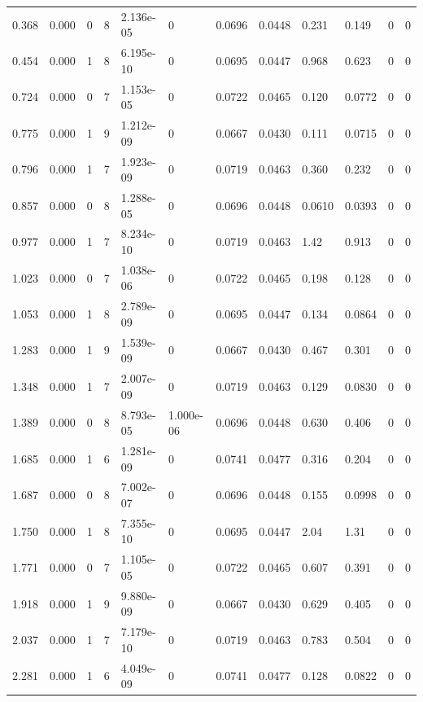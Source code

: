 \documentclass[preview]{standalone}
\begin{document}
{{\begin{tabular}{L{1.2cm}C{1.2cm} C{0.3cm}C{0.5cm} C{1.4cm}C{1.4cm} C{1.4cm}C{1.4cm} C{1.6cm}C{1.6cm} C{1.6cm}C{1.6cm}}
  0.368  &  0.000  & 0     &  8 &  2.136e-05  & 0  &  0.0696&   0.0448& 0.231 & 0.149   &  0 & 0  \\ 
  0.454  &  0.000  & 1     &  8 &  6.195e-10  & 0  &  0.0695&   0.0447& 0.968 & 0.623   &  0 & 0  \\ 
  0.724  &  0.000  & 0     &  7 &  1.153e-05  & 0  &  0.0722&   0.0465& 0.120 & 0.0772   &  0 & 0  \\ 
  0.775  &  0.000  & 1     &  9 &  1.212e-09  & 0  &  0.0667&   0.0430& 0.111 & 0.0715   &  0 & 0  \\ 
  0.796  &  0.000  & 1     &  7 &  1.923e-09  & 0  &  0.0719&   0.0463& 0.360 & 0.232   &  0 & 0  \\ 
  0.857  &  0.000  & 0     &  8 &  1.288e-05  & 0  &  0.0696&   0.0448& 0.0610 & 0.0393   &  0 & 0  \\ 
  0.977  &  0.000  & 1     &  7 &  8.234e-10  & 0  &  0.0719&   0.0463& 1.42 & 0.913   &  0 & 0  \\ 
  1.023  &  0.000  & 0     &  7 &  1.038e-06  & 0  &  0.0722&   0.0465& 0.198 & 0.128   &  0 & 0  \\ 
  1.053  &  0.000  & 1     &  8 &  2.789e-09  & 0  &  0.0695&   0.0447& 0.134 & 0.0864   &  0 & 0  \\ 
  1.283  &  0.000  & 1     &  9 &  1.539e-09  & 0  &  0.0667&   0.0430& 0.467 & 0.301   &  0 & 0  \\ 
  1.348  &  0.000  & 1     &  7 &  2.007e-09  & 0  &  0.0719&   0.0463& 0.129 & 0.0830   &  0 & 0  \\ 
  1.389  &  0.000  & 0     &  8 &  8.793e-05  & 1.000e-06  &  0.0696&   0.0448& 0.630 & 0.406   &  0 & 0  \\ 
  1.685  &  0.000  & 1     &  6 &  1.281e-09  & 0  &  0.0741&   0.0477& 0.316 & 0.204   &  0 & 0  \\ 
  1.687  &  0.000  & 0     &  8 &  7.002e-07  & 0  &  0.0696&   0.0448& 0.155 & 0.0998   &  0 & 0  \\ 
  1.750  &  0.000  & 1     &  8 &  7.355e-10  & 0  &  0.0695&   0.0447& 2.04 & 1.31   &  0 & 0  \\ 
  1.771  &  0.000  & 0     &  7 &  1.105e-05  & 0  &  0.0722&   0.0465& 0.607 & 0.391   &  0 & 0  \\ 
  1.918  &  0.000  & 1     &  9 &  9.880e-09  & 0  &  0.0667&   0.0430& 0.629 & 0.405   &  0 & 0  \\ 
  2.037  &  0.000  & 1     &  7 &  7.179e-10  & 0  &  0.0719&   0.0463& 0.783 & 0.504   &  0 & 0  \\ 
  2.281  &  0.000  & 1     &  6 &  4.049e-09  & 0  &  0.0741&   0.0477& 0.128 & 0.0822   &  0 & 0  \\ 

\end{tabular}}}
\end{document}
